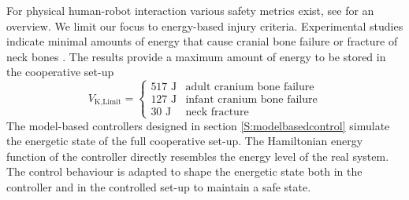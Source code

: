 \documentclass[a4paper,twoside, openright,12pt]{report}
\newcommand{\g}[1]{\text{#1}}
\begin{document}
{For physical human-robot interaction various safety metrics exist, see \cite{Haddadin_14} for an overview. We limit our focus to energy-based injury criteria. Experimental studies indicate minimal amounts of energy  that cause cranial bone failure \cite{Wood_71} or fracture of neck bones \cite{Yoganandan_96}. The results provide a maximum amount of energy to be stored in the cooperative set-up
\begin{equation}
V_{\g{K,Limit}} = 
\begin{cases}
517 \text{ J} & \text{adult cranium bone failure} \\
127 \text{ J} & \text{infant cranium bone failure} \\
30 \text{ J} & \text{neck fracture}
\end{cases}
\end{equation}
The model-based controllers designed in section \ref{S:modelbasedcontrol} simulate the energetic state of the full cooperative set-up. The Hamiltonian energy function of the controller directly resembles the energy level of the real system. The control behaviour is adapted to shape the energetic state both in the controller and in the controlled set-up to maintain a safe state. 
       
   


}
\end{document}
